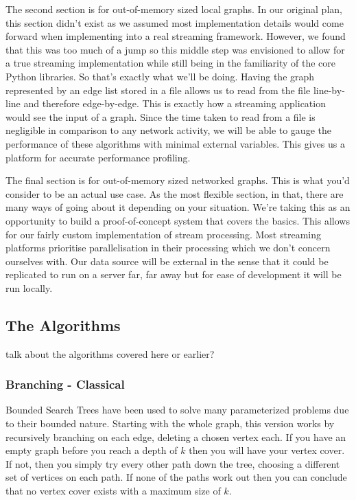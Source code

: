 The second section is for out-of-memory sized local graphs. In our original
plan, this section didn't exist as we assumed most implementation details would
come forward when implementing into a real streaming framework. However, we
found that this was too much of a jump so this middle step was envisioned to
allow for a true streaming implementation while still being in the familiarity
of the core Python libraries. So that's exactly what we'll be doing. Having the
graph represented by an edge list stored in a file allows us to read from the
file line-by-line and therefore edge-by-edge. This is exactly how a streaming
application would see the input of a graph. Since the time taken to read from a
file is negligible in comparison to any network activity, we will be able to
gauge the performance of these algorithms with minimal external variables. This
gives us a platform for accurate performance profiling.

The final section is for out-of-memory sized networked graphs. This is what
you'd consider to be an actual use case. As the most flexible section, in that,
there are many ways of going about it depending on your situation. We're taking
this as an opportunity to build a proof-of-concept system that covers the
basics. This allows for our fairly custom implementation of stream processing.
Most streaming platforms prioritise parallelisation in their processing which
we don't concern ourselves with. Our data source will be external in the sense
that it could be replicated to run on a server far, far away but for ease of
development it will be run locally.

\subsection{The Algorithms}

talk about the algorithms covered here or earlier?

\subsubsection{Branching - Classical}

Bounded Search Trees have been used to solve many parameterized problems due to
their bounded nature. Starting with the whole graph, this version works by
recursively branching on each edge, deleting a chosen vertex each. If you have
an empty graph before you reach a depth of \(k\) then you will have your vertex
cover. If not, then you simply try every other path down the tree, choosing a
different set of vertices on each path. If none of the paths work out then you
can conclude that no vertex cover exists with a maximum size of \(k\).

